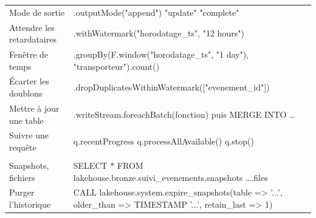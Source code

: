 \begin{center}
\begin{tabularx}{\textwidth}{@{}>{\raggedright\arraybackslash}p{4.1cm} >{\raggedright\arraybackslash\ttfamily\footnotesize}X@{}}
Mode de sortie & .outputMode("append") \quad "update" \quad "complete" \\
Attendre les retardataires & .withWatermark("horodatage\_ts", "12 hours") \\
Fenêtre de temps & .groupBy(F.window("horodatage\_ts", "1 day"), "transporteur").count() \\
Écarter les doublons & .dropDuplicatesWithinWatermark(["evenement\_id"]) \\
Mettre à jour une table & .writeStream.foreachBatch(fonction) \textrm{puis} MERGE INTO \dots \\
Suivre une requête & q.recentProgress \quad q.processAllAvailable() \quad q.stop() \\
\midrule
\multicolumn{2}{@{}l}{\textbf{\textcolor{lhblue}{Iceberg}}} \\
Snapshots, fichiers & SELECT * FROM lakehouse.bronze.suivi\_evenements.snapshots \quad \dots .files \\
Purger l'historique & CALL lakehouse.system.expire\_snapshots(table => '...', older\_than => TIMESTAMP '...', retain\_last => 1) \\
\bottomrule
\end{tabularx}
\end{center}
